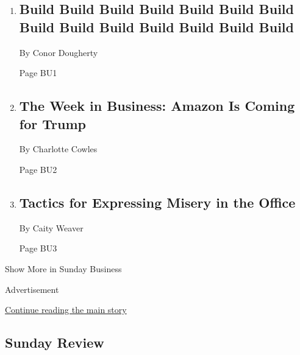 \begin{enumerate}
\def\labelenumi{\arabic{enumi}.}
\item
  \href{/2020/02/13/business/economy/housing-crisis-conor-dougherty-golden-gates.html}{}

  \hypertarget{build-build-build-build-build-build-build-build-build-build-build-build-build-build-1}{%
  \subsection{Build Build Build Build Build Build Build Build Build
  Build Build Build Build
  Build}\label{build-build-build-build-build-build-build-build-build-build-build-build-build-build-1}}

  By Conor Dougherty

  Page BU1
\item
  \href{/2020/02/16/business/amazon-trump-jedi.html}{}

  \hypertarget{the-week-in-business-amazon-is-coming-for-trump}{%
  \subsection{The Week in Business: Amazon Is Coming for
  Trump}\label{the-week-in-business-amazon-is-coming-for-trump}}

  By Charlotte Cowles

  Page BU2
\item
  \href{/2020/02/13/business/pain-work-memory-hole.html}{}

  \hypertarget{tactics-for-expressing-misery-in-the-office}{%
  \subsection{Tactics for Expressing Misery in the
  Office}\label{tactics-for-expressing-misery-in-the-office}}

  By Caity Weaver

  Page BU3
\end{enumerate}

Show More in Sunday Business

Advertisement

\protect\hyperlink{after-mid4}{Continue reading the main story}

\hypertarget{sunday-review}{%
\subsection{Sunday Review}\label{sunday-review}}

